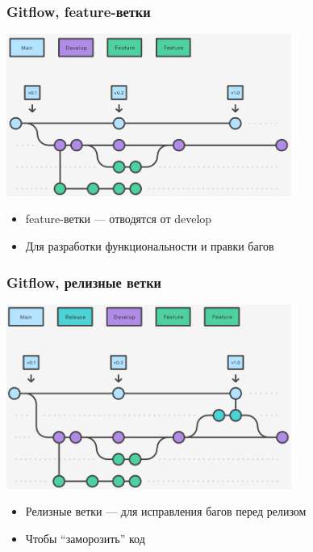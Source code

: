 \documentclass{../../slides-style}
\begin{document}
    \begin{frame}
        \frametitle{Gitflow, feature-ветки}
        \begin{center}
            \includegraphics[width=0.7\textwidth]{gitflow2.png}
        \end{center}
        \begin{itemize}
            \item feature-ветки --- отводятся от develop
            \item Для разработки функциональности и правки багов
        \end{itemize}
    \end{frame}

    \begin{frame}
        \frametitle{Gitflow, релизные ветки}
        \begin{center}
            \includegraphics[width=0.7\textwidth]{gitflow3.png}
        \end{center}
        \begin{itemize}
            \item Релизные ветки --- для исправления багов перед релизом
            \item Чтобы ``заморозить'' код
        \end{itemize}
    \end{frame}
\end{document}
